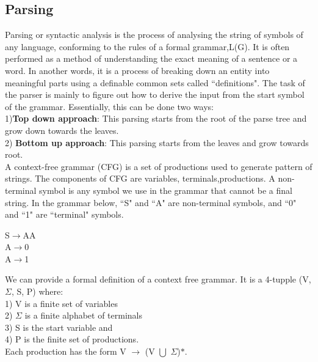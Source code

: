 \documentclass[12pt]{article}
\begin{document}
\subsection{Parsing}
Parsing or syntactic analysis is the process of analysing the string of symbols of any language, conforming to the rules of a formal grammar,L(G).  It is often performed as a method of understanding the exact meaning of a sentence or a word. In another words, it is a process of breaking down an entity into meaningful parts using a definable common sets called  ``definitions". The task of the parser is mainly to figure out how to derive the input from the start symbol of the grammar. Essentially, this can be done two ways:\\
1){\bf Top down approach}: This parsing starts from the root of the parse tree and grow down towards  the leaves.\\
2) {\bf Bottom up approach}: This parsing starts from the leaves and grow towards root.\\
A context-free grammar (CFG) is a set of productions used to generate pattern of strings. The components of CFG are variables, terminals,productions. A non-terminal symbol is any symbol we use in the grammar that cannot be a final string. In the grammar below, ``S" and ``A" are non-terminal symbols, and ``0" and ``1" are ``terminal" symbols.\\

\vspace{20 mm}
\begin{center}
S$\rightarrow$AA\\
A$\rightarrow$0\\
A$\rightarrow$1\\
\end{center}
\vspace{10 mm}
We can provide a formal definition of a context free grammar. It is a 4-tupple (V,$\Sigma$, S, P) where:\\
1) V is a finite set of variables \\
2) $\Sigma$ is a finite alphabet of terminals\\
3) S is the start variable and\\
4) P is the finite set of productions.\\ Each production has the form V $\rightarrow$ (V $\bigcup$ $\Sigma$)$\ast$.
\end{document}
